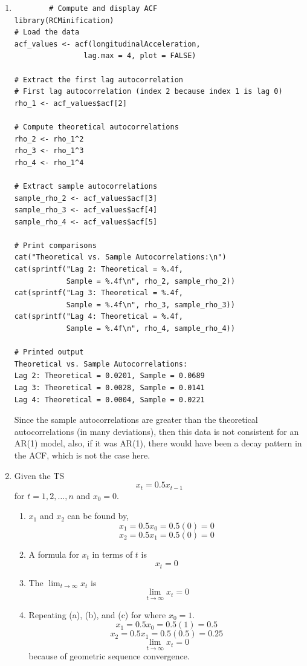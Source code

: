 \documentclass[12pt]{article}
\begin{document}
\begin{enumerate}
    \item 
    \begin{verbatim}
        # Compute and display ACF
library(RCMinification)
# Load the data
acf_values <- acf(longitudinalAcceleration, 
                lag.max = 4, plot = FALSE)

# Extract the first lag autocorrelation
# First lag autocorrelation (index 2 because index 1 is lag 0)
rho_1 <- acf_values$acf[2]

# Compute theoretical autocorrelations
rho_2 <- rho_1^2
rho_3 <- rho_1^3
rho_4 <- rho_1^4

# Extract sample autocorrelations
sample_rho_2 <- acf_values$acf[3]
sample_rho_3 <- acf_values$acf[4]
sample_rho_4 <- acf_values$acf[5]

# Print comparisons
cat("Theoretical vs. Sample Autocorrelations:\n")
cat(sprintf("Lag 2: Theoretical = %.4f, 
            Sample = %.4f\n", rho_2, sample_rho_2))
cat(sprintf("Lag 3: Theoretical = %.4f, 
            Sample = %.4f\n", rho_3, sample_rho_3))
cat(sprintf("Lag 4: Theoretical = %.4f, 
            Sample = %.4f\n", rho_4, sample_rho_4))

# Printed output
Theoretical vs. Sample Autocorrelations:
Lag 2: Theoretical = 0.0201, Sample = 0.0689
Lag 3: Theoretical = 0.0028, Sample = 0.0141
Lag 4: Theoretical = 0.0004, Sample = 0.0221
    \end{verbatim}
    Since the sample autocorrelations are greater than the theoretical autocorrelations (in many deviations),
    then this data is not consistent for an AR(1) model, also, if it was AR(1), there would have been a decay
    pattern in the ACF, which is not the case here.
    
    \item Given the TS
    \[ x_t = 0.5x_{t-1} \]
    for $t = 1,2, \ldots, n$ and $x_0 = 0$.

    \begin{enumerate}
        \item $x_1$ and $x_2$ can be found by,
        \[ x_1 = 0.5x_0 = 0.5(0) = 0 \]
        \[ x_2 = 0.5x_1 = 0.5(0) = 0 \]
        \item A formula for $x_t$ in terms of $t$ is
        \[ x_t = 0 \]
        \item The $\lim_{t \to \infty} x_t$ is
        \[ \lim_{t \to \infty} x_t = 0 \]
        \item Repeating (a), (b), and (c) for where $x_0 = 1$.
        \[ x_1 = 0.5x_0 = 0.5(1) = 0.5 \]
        \[ x_2 = 0.5x_1 = 0.5(0.5) = 0.25 \]
        \[ \lim_{t \to \infty} x_t = 0 \]
        because of geometric sequence convergence.
    \end{enumerate}


\end{enumerate}
\end{document}
